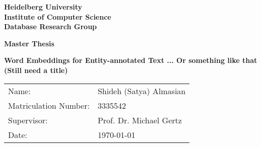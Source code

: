 \begin{titlepage}
  
\vspace*{1cm}
\begin{center}
\vspace*{3cm}
\textbf{ 
\Large Heidelberg University\\
\smallskip
\Large Institute of Computer Science \\
\smallskip
\Large Database Research Group\\
\smallskip
}

\vspace{3cm}

\textbf{\large Master Thesis } %

\vspace{0.5\baselineskip}
{\huge
\textbf{Word Embeddings for Entity-annotated Text ... Or something like that (Still need a title) }
}
\end{center}

\vfill 

{\large
\begin{tabular}[l]{ll}
Name: & Shideh (Satya) Almasian \\
Matriculation Number: & 3335542\\
Supervisor: & Prof. Dr. Michael Gertz\\
Date: & \today
\end{tabular}
}

\end{titlepage}

\newpage
\null
\thispagestyle{empty}
\newpage
